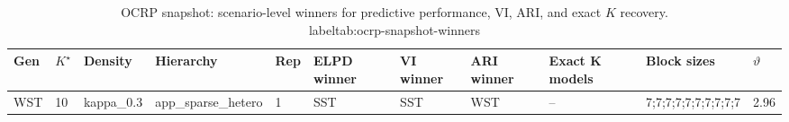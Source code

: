 \begin{table}[!h]
\centering
\caption{OCRP snapshot: scenario-level winners for predictive performance, VI, ARI, and exact $K$ recovery.\\label{tab:ocrp-snapshot-winners}}
\centering
\begin{tabular}[t]{lllllllllll}
\toprule
Gen & $K^\star$ & Density & Hierarchy & Rep & ELPD winner & VI winner & ARI winner & Exact K models & Block sizes & $\vartheta$\\
\midrule
WST & 10 & kappa_0.3 & app_sparse_hetero & 1 & SST & SST & WST & -- & 7;7;7;7;7;7;7;7;7;7 & 2.96\\
\bottomrule
\end{tabular}
\end{table}
